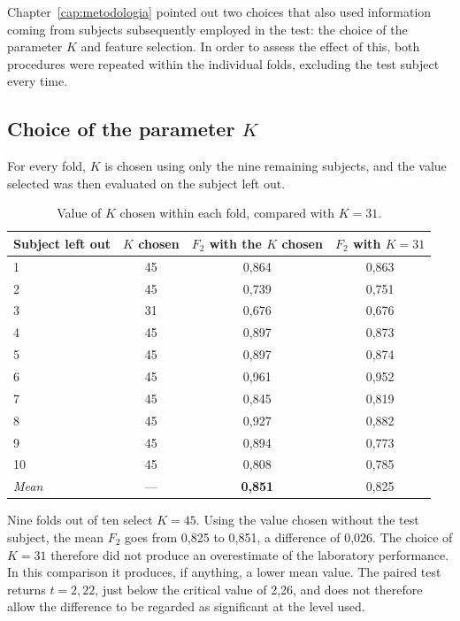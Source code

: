 Chapter~\ref{cap:metodologia} pointed out two choices that also used information coming from subjects subsequently employed in the test: the choice of the parameter $K$ and feature selection. In order to assess the effect of this, both procedures were repeated within the individual folds, excluding the test subject every time.

\subsection{Choice of the parameter $K$}

For every fold, $K$ is chosen using only the nine remaining subjects, and the value selected was then evaluated on the subject left out.

\begin{table}[htbp]
\centering
\caption{Value of $K$ chosen within each fold, compared with $K=31$.}
\label{tab:k_misura}
\begin{tabular}{@{}lccc@{}}
\toprule
\textbf{Subject left out} & \textbf{$K$ chosen} & \textbf{$F_2$ with the $K$ chosen} & \textbf{$F_2$ with $K=31$} \\
\midrule 1 & 45 & 0,864 & 0,863
\\ 2 & 45 & 0,739 & 0,751
\\ 3 & 31 & 0,676 & 0,676
\\ 4 & 45 & 0,897 & 0,873
\\ 5 & 45 & 0,897 & 0,874
\\ 6 & 45 & 0,961 & 0,952
\\ 7 & 45 & 0,845 & 0,819
\\ 8 & 45 & 0,927 & 0,882
\\ 9 & 45 & 0,894 & 0,773
\\ 10 & 45 & 0,808 & 0,785
\\
\midrule
\emph{Mean} & --- & \textbf{0,851} & 0,825 \\
\bottomrule
\end{tabular}
\end{table}

Nine folds out of ten select $K=45$. Using the value chosen without the test subject, the mean $F_2$ goes from 0,825 to 0,851, a difference of 0,026. The choice of $K=31$ therefore did not produce an overestimate of the laboratory performance. In this comparison it produces, if anything, a lower mean value. The paired test returns $t=2{,}22$, just below the critical value of 2,26, and does not therefore allow the difference to be regarded as significant at the level used.

